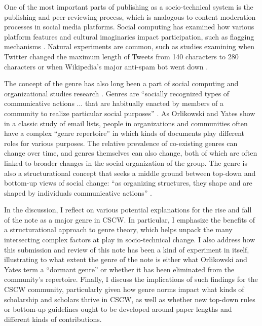 \documentclass[format=acmsmall, screen=true]{acmart}
\begin{document}
One of the most important parts of publishing as a socio-technical system is the publishing and peer-reviewing process, which is analogous to content moderation processes in social media platforms. Social computing has examined how various platform features and cultural imaginaries impact participation, such as flagging mechanisms \cite{crawford2016flag}. Natural experiments are common, such as studies examining when Twitter changed the maximum length of Tweets from 140 characters to 280 characters \cite{gligoric2018constraints,rimjhim2018characterizing} or when Wikipedia's major anti-spam bot went down \cite{geiger2013levee}. 

The concept of the genre has also long been a part of social computing and organizational studies research \cite{orlikowski_genre_1994, morgan2010negotiating, herring2004bridging, spinuzzi2000genre}. Genres are ``socially recognized types of communicative actions ... that are habitually enacted by members of a community to realize particular social purposes'' \cite[p. 542]{orlikowski_genre_1994}. As Orlikowski and Yates show in a classic study of email lists, people in organizations and communities often have a complex ``genre repertoire'' \cite[p. 546]{orlikowski_genre_1994} in which kinds of documents play different roles for various purposes. The relative prevalence of co-existing genres can change over time, and genres themselves can also change, both of which are often linked to broader changes in the social organization of the group. The genre is also a structurational \cite{anthony1984constitution} concept that seeks a middle ground between top-down and bottom-up views of social change: ``as organizing structures, they shape and are shaped by individuals communicative actions'' \cite[p. 541]{orlikowski_genre_1994}. 

In the discussion, I reflect on various potential explanations for the rise and fall of the note as a major genre in CSCW. In particular, I emphasize the benefits of a structurational approach to genre theory, which helps unpack the many intersecting complex factors at play in socio-technical change. I also address how this submission and review of this note has been a kind of experiment in itself, illustrating to what extent the genre of the note is either what Orlikowski and Yates term a ``dormant genre'' or whether it has been eliminated from the community's repertoire. Finally, I discuss the implications of such findings for the CSCW community, particularly given how genre norms impact what kinds of scholarship and scholars thrive in CSCW, as well as whether new top-down rules or bottom-up guidelines ought to be developed around paper lengths and different kinds of contributions. 
\end{document}
